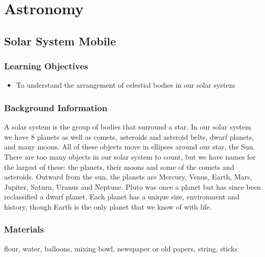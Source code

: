 \section{Astronomy}

\subsection{Solar System Mobile}

\subsubsection*{Learning Objectives}
\begin{itemize}
\item{To understand the arrangement of celestial bodies in our solar system}
\end{itemize}

\subsubsection*{Background Information}
A solar system is the group of bodies that surround a star. In our solar system we have 8 planets as well as comets, asteroids and asteroid belts, dwarf planets, and many moons. All of these objects move in ellipses around our star, the Sun. There are too many objects in our solar system to count, but we have names for the largest of these: the planets, their moons and some of the comets and asteroids. Outward from the sun, the planets are Mercury, Venus, Earth, Mars, Jupiter, Saturn, Uranus and Neptune. Pluto was once a planet but has since been reclassified a dwarf planet. Each planet has a unique size, environment and history, though Earth is the only planet that we know of with life.

\subsubsection*{Materials} flour, water, balloons, mixing bowl, newspaper or old papers, string, sticks

